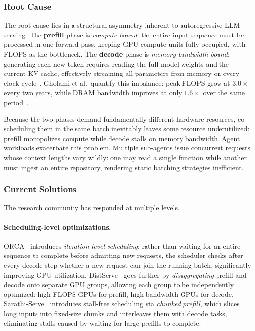 \subsubsection{Root Cause}
The root cause lies in a structural asymmetry inherent to autoregressive LLM serving.
The \textbf{prefill} phase is \emph{compute-bound}: the entire input sequence must be processed in one forward pass, keeping GPU compute units fully occupied, with FLOPS as the bottleneck.
The \textbf{decode} phase is \emph{memory-bandwidth-bound}: generating each new token requires reading the full model weights and the current KV cache, effectively streaming all parameters from memory on every clock cycle~\cite{gholami2024memorywall}.
Gholami et al.\ quantify this imbalance: peak FLOPS grow at $3.0\times$ every two years, while DRAM bandwidth improves at only $1.6\times$ over the same period~\cite{gholami2024memorywall}.

Because the two phases demand fundamentally different hardware resources, co-scheduling them in the same batch inevitably leaves some resource underutilized: prefill monopolizes compute while decode stalls on memory bandwidth.
Agent workloads exacerbate this problem.
Multiple sub-agents issue concurrent requests whose context lengths vary wildly: one may read a single function while another must ingest an entire repository, rendering static batching strategies inefficient.

\subsubsection{Current Solutions}
The research community has responded at multiple levels.

\paragraph{Scheduling-level optimizations.}
ORCA~\cite{orca2022} introduces \emph{iteration-level scheduling}: rather than waiting for an entire sequence to complete before admitting new requests, the scheduler checks after every decode step whether a new request can join the running batch, significantly improving GPU utilization.
DistServe~\cite{zhong2024distserve} goes further by \emph{disaggregating} prefill and decode onto separate GPU groups, allowing each group to be independently optimized: high-FLOPS GPUs for prefill, high-bandwidth GPUs for decode.
Sarathi-Serve~\cite{agrawal2024sarathi} introduces stall-free scheduling via \emph{chunked prefill}, which slices long inputs into fixed-size chunks and interleaves them with decode tasks, eliminating stalls caused by waiting for large prefills to complete.


